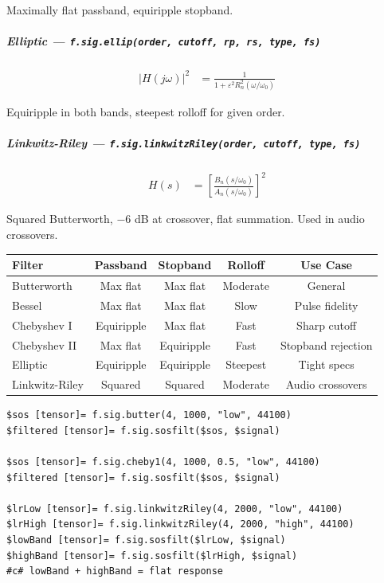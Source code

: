 Maximally flat passband, equiripple stopband.

\subparagraph{Elliptic --- \texttt{f.sig.ellip(order, cutoff, rp, rs, type, fs)}}

\begin{align}
|H(j\omega)|^2 &= \frac{1}{1 + \varepsilon^2 R_n^2(\omega/\omega_0)} \label{eq:sig-ellip}
\end{align}

Equiripple in both bands, steepest rolloff for given order.

\subparagraph{Linkwitz-Riley --- \texttt{f.sig.linkwitzRiley(order, cutoff, type, fs)}}

\begin{align}
H(s) &= \left[\frac{B_n(s/\omega_0)}{A_n(s/\omega_0)}\right]^2 \label{eq:sig-lr}
\end{align}

Squared Butterworth, $-6$ dB at crossover, flat summation. Used in audio crossovers.

\begin{tabular}{|l|c|c|c|c|}
\hline
\textbf{Filter} & \textbf{Passband} & \textbf{Stopband} & \textbf{Rolloff} & \textbf{Use Case} \\
\hline
Butterworth & Max flat & Max flat & Moderate & General \\
Bessel & Max flat & Max flat & Slow & Pulse fidelity \\
Chebyshev I & Equiripple & Max flat & Fast & Sharp cutoff \\
Chebyshev II & Max flat & Equiripple & Fast & Stopband rejection \\
Elliptic & Equiripple & Equiripple & Steepest & Tight specs \\
Linkwitz-Riley & Squared & Squared & Moderate & Audio crossovers \\
\hline
\end{tabular}

\begin{verbatim}
$sos [tensor]= f.sig.butter(4, 1000, "low", 44100)
$filtered [tensor]= f.sig.sosfilt($sos, $signal)

$sos [tensor]= f.sig.cheby1(4, 1000, 0.5, "low", 44100)
$filtered [tensor]= f.sig.sosfilt($sos, $signal)

$lrLow [tensor]= f.sig.linkwitzRiley(4, 2000, "low", 44100)
$lrHigh [tensor]= f.sig.linkwitzRiley(4, 2000, "high", 44100)
$lowBand [tensor]= f.sig.sosfilt($lrLow, $signal)
$highBand [tensor]= f.sig.sosfilt($lrHigh, $signal)
#c# lowBand + highBand = flat response
\end{verbatim}

